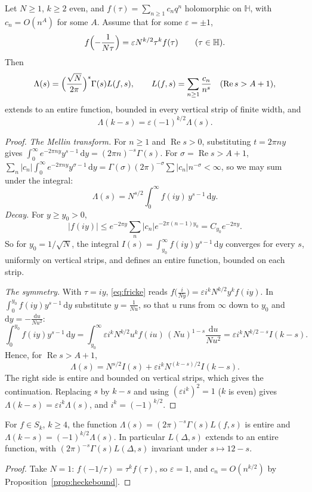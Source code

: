 \begin{theorem}[Hecke, 1936]\label{thm:heckefe}
Let $N\ge1$, $k\ge2$ even, and $f(\tau)=\sum_{n\ge1}c_nq^n$ holomorphic on $\mathbb H$, with $c_n=O(n^A)$ for some $A$. Assume that for some $\varepsilon=\pm1$,
\begin{equation}\label{eq:fricke}
f\Bigl(-\frac1{N\tau}\Bigr)=\varepsilon N^{k/2}\tau^kf(\tau)\qquad(\tau\in\mathbb H).
\end{equation}
Then
\[
\Lambda(s)=\Bigl(\frac{\sqrt N}{2\pi}\Bigr)^s\Gamma(s)L(f,s),\qquad L(f,s)=\sum_{n\ge1}\frac{c_n}{n^s}\quad(\operatorname{Re}s>A+1),
\]
extends to an entire function, bounded in every vertical strip of finite width, and
\[
\Lambda(k-s)=\varepsilon(-1)^{k/2}\Lambda(s).
\]
\end{theorem}
\begin{proof}
\emph{The Mellin transform.} For $n\ge1$ and $\operatorname{Re}s>0$, substituting $t=2\pi ny$ gives $\int_0^\infty e^{-2\pi ny}y^{s-1}\,\mathrm dy=(2\pi n)^{-s}\Gamma(s)$. For
$\sigma=\operatorname{Re}s>A+1$, $\sum_n|c_n|\int_0^\infty e^{-2\pi ny}y^{\sigma-1}\,\mathrm dy=\Gamma(\sigma)(2\pi)^{-\sigma}\sum|c_n|n^{-\sigma}<\infty$, so we may sum under the
integral:
\[
\Lambda(s)=N^{s/2}\int_0^\infty f(iy)\,y^{s-1}\,\mathrm dy.
\]
\emph{Decay.} For $y\ge y_0>0$,
\[
|f(iy)|\le e^{-2\pi y}\sum_n|c_n|e^{-2\pi(n-1)y_0}=C_{y_0}e^{-2\pi y}.
\]
So for $y_0=1/\sqrt N$, the integral
$I(s)=\int_{y_0}^\infty f(iy)y^{s-1}\,\mathrm dy$ converges for every $s$, uniformly on vertical strips, and defines an entire function, bounded on each strip.

\emph{The symmetry.} With $\tau=iy$, \eqref{eq:fricke} reads $f\bigl(\frac i{Ny}\bigr)=\varepsilon i^kN^{k/2}y^kf(iy)$. In $\int_0^{y_0}f(iy)y^{s-1}\,\mathrm dy$ substitute $y=\frac1{Nu}$,
so that $u$ runs from $\infty$ down to $y_0$ and $\mathrm dy=-\frac{\mathrm du}{Nu^2}$:
\[
\int_0^{y_0}f(iy)y^{s-1}\,\mathrm dy=\int_{y_0}^\infty\varepsilon i^kN^{k/2}u^kf(iu)\,(Nu)^{1-s}\frac{\mathrm du}{Nu^2}=\varepsilon i^kN^{k/2-s}I(k-s).
\]
Hence, for $\operatorname{Re}s>A+1$,
\[
\Lambda(s)=N^{s/2}I(s)+\varepsilon i^kN^{(k-s)/2}I(k-s).
\]
The right side is entire and bounded on vertical strips, which gives the continuation. Replacing $s$ by $k-s$ and using $(\varepsilon i^k)^2=1$ ($k$ is even) gives
$\Lambda(k-s)=\varepsilon i^k\Lambda(s)$, and $i^k=(-1)^{k/2}$.
\end{proof}

\begin{corollary}\label{cor:level1fe}
For $f\in S_k$, $k\ge4$, the function $\Lambda(s)=(2\pi)^{-s}\Gamma(s)L(f,s)$ is entire and $\Lambda(k-s)=(-1)^{k/2}\Lambda(s)$. In particular $L(\Delta,s)$ extends to an entire
function, with $(2\pi)^{-s}\Gamma(s)L(\Delta,s)$ invariant under $s\mapsto12-s$.
\end{corollary}
\begin{proof}
Take $N=1$: $f(-1/\tau)=\tau^kf(\tau)$, so $\varepsilon=1$, and $c_n=O(n^{k/2})$ by Proposition~\ref{prop:heckebound}.
\end{proof}

